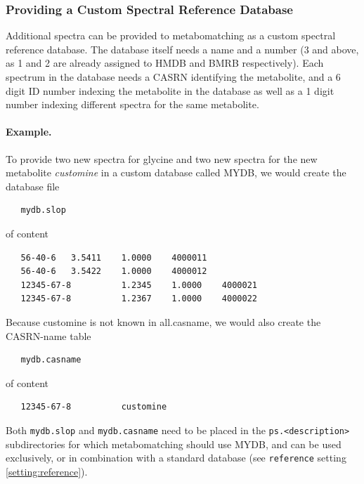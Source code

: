 \documentclass[a4paper,11pt]{article}
\begin{document}
\subsubsection{Providing a Custom Spectral Reference Database}
Additional spectra can be provided to metabomatching as a custom spectral reference database. The database itself needs a name and a number (3 and above, as 1 and 2 are already assigned to HMDB and BMRB respectively). Each spectrum in the database needs a CASRN identifying the metabolite, and a 6 digit ID number indexing the metabolite in the database as well as a 1 digit number indexing different spectra for the same metabolite. 
\paragraph{Example.} To provide two new spectra for glycine and two new spectra for the new metabolite \emph{customine} in a custom database called MYDB, we would create the database file
\begin{verbatim}
   mydb.slop
\end{verbatim}
of content
\begin{verbatim}
   56-40-6   3.5411    1.0000    4000011
   56-40-6   3.5422    1.0000    4000012   
   12345-67-8          1.2345    1.0000    4000021
   12345-67-8          1.2367    1.0000    4000022   
\end{verbatim}
Because customine is not known in all.casname, we would also create the CASRN-name table
\begin{verbatim}
   mydb.casname
\end{verbatim}
of content
\begin{verbatim}
   12345-67-8          customine
\end{verbatim}
Both \verb|mydb.slop| and \verb|mydb.casname| need to be placed in the \verb|ps.<description>| subdirectories for which metabomatching should use MYDB, and can be used exclusively, or in combination with a standard database (see \verb|reference| setting \ref{setting:reference}).
\end{document}
